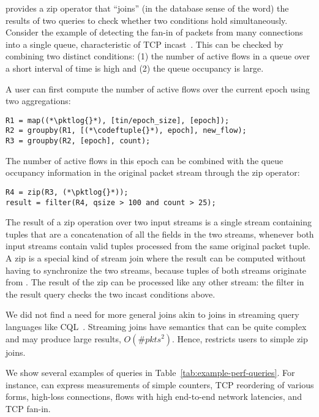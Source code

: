  \TheSystem provides a {\ct zip} operator
that ``joins'' (in the database sense of the word) the results of two queries
to check whether two conditions hold simultaneously. Consider the example of
detecting the fan-in of packets from many connections into a single queue,
characteristic of TCP incast~\cite{tcpincast}. This can be checked by combining
two distinct conditions: (1) the number of active flows in a queue over a short
interval of time is high and (2) the queue occupancy is large.

A user can first compute the number of active flows over the current epoch using
two aggregations:

\begin{lstlisting}
R1 = map((*\pktlog{}*), [tin/epoch_size], [epoch]);
R2 = groupby(R1, [(*\codeftuple{}*), epoch], new_flow);
R3 = groupby(R2, [epoch], count);
\end{lstlisting}

The number of active flows in this epoch can be combined with the queue
occupancy information in the original packet stream through the {\ct zip}
operator:

\begin{lstlisting}
R4 = zip(R3, (*\pktlog{}*));
result = filter(R4, qsize > 100 and count > 25);
\end{lstlisting}

The result of a {\ct zip} operation over two input streams is a single stream
containing tuples that are a concatenation of all the fields in the two
streams, whenever both input streams contain valid tuples processed from the
same original packet tuple. A {\ct zip} is a special kind of stream join where
the result can be computed without having to synchronize the two streams,
because tuples of both streams originate from {\ct \pktlog}. The result of the
{\ct zip} can be processed like any other stream: the {\ct filter} in the {\ct
result} query checks the two incast conditions above.

We did not find a need for more general joins akin to joins in streaming query
languages like CQL~\cite{cql-vldb}. Streaming joins have semantics that can be
quite complex and may produce large results, \ie $O(\#pkts^2)$.  Hence,
\TheSystem restricts users to simple {\ct zip} joins.

We show several examples of \TheSystem queries in
Table~\ref{tab:example-perf-queries}.  For instance, \TheSystem can express
measurements of simple counters, TCP reordering of various forms, high-loss
connections, flows with high end-to-end network latencies, and TCP fan-in. 

